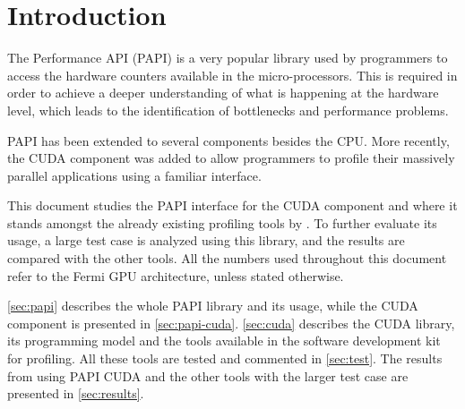 \section{Introduction}


The Performance API (PAPI) is a very popular library used by programmers to access the hardware counters available in the micro-processors. This is required in order to achieve a deeper understanding of what is happening at the hardware level, which leads to the identification of bottlenecks and performance problems.

PAPI has been extended to several components besides the CPU. More recently, the CUDA component was added to allow programmers to profile their massively parallel applications using a familiar interface.

This document studies the PAPI interface for the CUDA component and where it stands amongst the already existing profiling tools by \nvidia. To further evaluate its usage, a large test case is analyzed using this library, and the results are compared with the other tools. All the numbers used throughout this document refer to the Fermi GPU architecture, unless stated otherwise.

\cref{sec:papi} describes the whole PAPI library and its usage, while the CUDA component is presented in \cref{sec:papi-cuda}. \cref{sec:cuda} describes the CUDA library, its programming model and the tools available in the software development kit for profiling. All these tools are tested and commented in \cref{sec:test}. The results from using PAPI CUDA and the other tools with the larger test case are presented in \cref{sec:results}.
